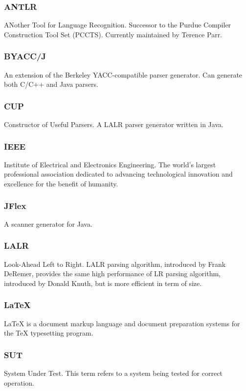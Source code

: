 \subsubsection*{ANTLR}

ANother Tool for Language Recognition. Successor to the Purdue Compiler Construction Tool Set (PCCTS). Currently maintained by Terence Parr.

\subsubsection*{BYACC/J}

An extension of the Berkeley YACC-compatible parser generator. Can generate both C/C++ and Java parsers.

\subsubsection*{CUP}

Constructor of Useful Parsers. A LALR parser generator written in Java.

\subsubsection*{IEEE}

Institute of Electrical and Electronics Engineering. The world's largest professional association dedicated to advancing technological innovation and excellence for the benefit of humanity.

\subsubsection*{JFlex}

A scanner generator for Java.

\subsubsection*{LALR}

Look-Ahead Left to Right. LALR parsing algorithm, introduced by Frank DeRemer, provides the same high performance of LR parsing algorithm, introduced by Donald Knuth, but is more efficient in term of size.

\subsubsection*{LaTeX}

LaTeX is a document markup language and document preparation systems for the TeX typesetting program.

\subsubsection*{SUT}

System Under Test. This term refers to a system being tested for correct operation.

